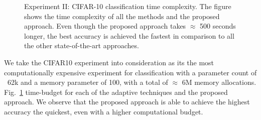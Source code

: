 \begin{figure}[ht]
    \caption{Experiment II: CIFAR-10 classification time complexity. The figure shows the time complexity of all the methods and the proposed approach. Even though the proposed approach takes $\approx$ 500 seconds longer, the best accuracy is achieved the fastest in comparison to all the other state-of-the-art approaches.}\label{appnd:CIFAR10-timings}
\end{figure}
We take the CIFAR10 experiment into consideration as its the most computationally expensive experiment for classification with a parameter count of ~62k and a memory parameter of 100, with a total of $\approx$ 6M memory allocations. Fig.\ \ref{appnd:CIFAR10-timings} time-budget for each of the adaptive techniques and the proposed approach. We observe that the proposed approach is able to achieve the highest accuracy the quickest, even with a higher computational budget.
